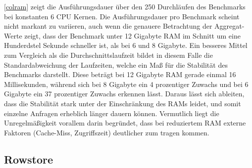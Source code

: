 \autoref{colram} zeigt die Ausführungsdauer über den 250 Durchläufen des Benchmarks bei konstanten 6 CPU Kernen. Die Ausführungsdauer pro Benchmark scheint nicht markant zu variieren, auch wenn die genauere Betrachtung der Aggregat-Werte zeigt, dass der Benchmark unter 12 Gigabyte RAM im Schnitt um eine Hunderdstel Sekunde schneller ist, als bei 6 und 8 Gigabyte. Ein besseres Mittel zum Vergleich als die Durchschnittslaufzeit bildet in diesem Falle die Standardabweichung der Laufzeiten, welche ein Maß für die Stabilität des Benchmarks darstellt. Diese beträgt bei 12 Gigabyte RAM gerade einmal 16 Millisekunden, während sich bei 8 Gigabyte ein 4 prozentiger Zuwachs und bei 6 Gigabyte ein 37 prozentiger Zuwachs erkennen lässt. Daraus lässt sich ableiten, dass die Stabilität stark unter der Einschränkung des RAMs leidet, und somit einzelne Anfragen erheblich länger dauern können. Vermutlich liegt die Unregelmäßigkeit vorallem darin begründet, dass bei reduziertem RAM externe Faktoren (Cache-Miss, Zugriffszeit) deutlicher zum tragen kommen. 

\subsection{Rowstore}

\begin{figure}[H]
\end{figure}

